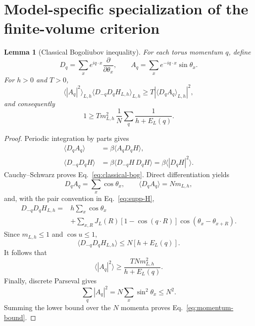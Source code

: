 \documentclass[aps,prb,preprint,notitlepage,groupedaddress,amsmath,amssymb,
               superscriptaddress,nofootinbib,floatfix]{revtex4-2}
\theoremstyle{definition}
\theoremstyle{plain}
\newtheorem{lemma}{Lemma}
\begin{document}
\section{Model-specific specialization of the finite-volume criterion}

\begin{lemma}[Classical Bogoliubov inequality]
For each torus momentum $q$, define
\begin{equation}
 D_q=\sum_xe^{iq\cdot x}\frac{\partial}{\partial\theta_x},
 \qquad
 A_q=\sum_xe^{-iq\cdot x}\sin\theta_x.
\end{equation}
For $h>0$ and $T>0$,
\begin{equation}
 \langle|A_q|^2\rangle_{L,h}
 \langle D_{-q}D_qH_{L,h}\rangle_{L,h}
 \ge T|\langle D_qA_q\rangle_{L,h}|^2,
 \label{eq:classical-bog}
\end{equation}
and consequently
\begin{equation}
 \boxed{\displaystyle
 1\ge Tm_{L,h}^2\,
 \frac1N\sum_q\frac1{h+E_L(q)}.}
 \label{eq:momentum-bound}
\end{equation}
\end{lemma}

\begin{proof}
Periodic integration by parts gives
\begin{align}
 \langle D_qA_q\rangle
 &=\beta\langle A_qD_qH\rangle,\\
 \langle D_{-q}D_qH\rangle
 &=\beta\langle D_{-q}H\,D_qH\rangle
 =\beta\langle|D_qH|^2\rangle.
\end{align}
Cauchy--Schwarz proves Eq.~\eqref{eq:classical-bog}.  Direct
differentiation yields
\begin{equation}
 D_qA_q=\sum_x\cos\theta_x,\qquad
 \langle D_qA_q\rangle=Nm_{L,h},
\end{equation}
and, with the pair convention in Eq.~\eqref{eq:supp-H},
\begin{align}
 D_{-q}D_qH_{L,h}
 ={}&h\sum_x\cos\theta_x\nonumber\\
 &+\sum_{x,R}J_L(R)[1-\cos(q\cdot R)]
 \cos(\theta_x-\theta_{x+R}).
\end{align}
Since $m_{L,h}\le1$ and $\cos u\le1$,
\begin{equation}
 \langle D_{-q}D_qH_{L,h}\rangle
 \le N[h+E_L(q)].
\end{equation}
It follows that
\begin{equation}
 \langle|A_q|^2\rangle
 \ge\frac{TNm_{L,h}^2}{h+E_L(q)}.
\end{equation}
Finally, discrete Parseval gives
\begin{equation}
 \sum_q|A_q|^2=N\sum_x\sin^2\theta_x\le N^2.
\end{equation}
Summing the lower bound over the $N$ momenta proves
Eq.~\eqref{eq:momentum-bound}.
\end{proof}
\end{document}
